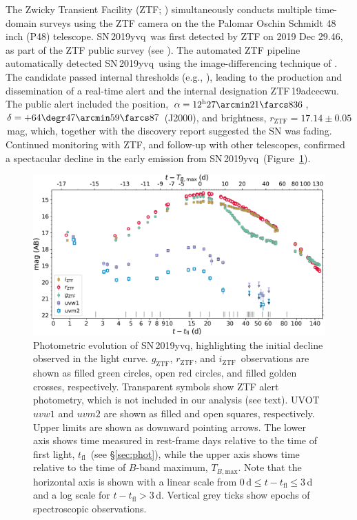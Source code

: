 \documentclass[twocolumn]{aastex63}
\newcommand{\rztf}{$r_\mathrm{ZTF}$}
\newcommand{\gztf}{$g_\mathrm{ZTF}$}
\newcommand{\iztf}{$i_\mathrm{ZTF}$}
\newcommand{\tfl}{$t_\mathrm{fl}$}
\newcommand{\tbmax}{$T_{B,\mathrm{max}}$}
\newcommand{\sn}{SN\,2019yvq}
\begin{document}
The Zwicky Transient Facility (ZTF; \citealt{Bellm19,Graham19,Dekany20})
simultaneously conducts multiple time-domain surveys using the ZTF camera on
the the Palomar Oschin Schmidt 48 inch (P48) telescope. \sn\ was first
detected by ZTF on 2019 Dec 29.46, as part of the ZTF public survey (see
\citealt{Bellm19a}). The automated ZTF pipeline \citep{Masci19} automatically
detected \sn\ using the image-differencing technique of \citet{Zackay16}. The
candidate passed internal thresholds (e.g., \citealt{Mahabal19}), leading to
the production and dissemination of a real-time alert \citep{Patterson19} and
the internal designation ZTF\,19adcecwu. The public alert included the
position, $\alpha = 12^{\mathrm{h}}27\arcmin21\farcs836$, $\delta =
+64\degr47\arcmin59\farcs87$ (J2000), and brightness, \rztf$ =
17.14\pm0.05$\,mag, which, together with the \citet{Itagaki19} discovery
report suggested the SN was fading. Continued monitoring with ZTF, and
follow-up with other telescopes, confirmed a spectacular decline in the early
emission from \sn\ (Figure~\ref{fig:p48}).

\begin{figure}
    \centering
    \includegraphics[width=6in]{./figures/P48_lc.pdf}
    \caption{Photometric evolution of \sn, highlighting the initial decline
    observed in the light curve. \gztf, \rztf, and \iztf\ observations are
    shown as filled green circles, open red circles, and filled golden
    crosses, respectively. Transparent symbols show ZTF alert photometry,
    which is not included in our analysis (see text). UVOT $uvw1$ and $uvm2$
    are shown as filled and open squares, respectively. Upper limits are shown
    as downward pointing arrows. The lower axis shows time measured in
    rest-frame days relative to the time of first light, \tfl\ (see
    \S\ref{sec:phot}), while the upper axis shows time relative to the time of
    $B$-band maximum, \tbmax. Note that the horizontal axis is shown with a
    linear scale from $0\,\mathrm{d} \le t - t_\mathrm{fl} \le 3$\,d and a log
    scale for $t - t_\mathrm{fl} > 3$\,d. Vertical grey ticks show epochs of
    spectroscopic observations.}
    \label{fig:p48}
\end{figure}
\end{document}
